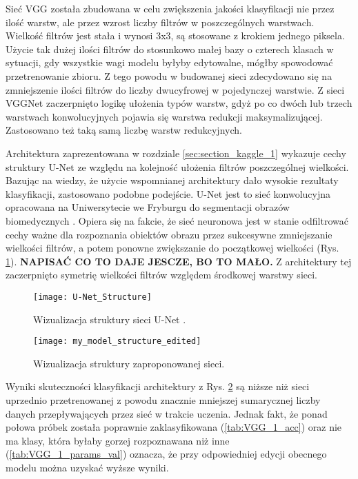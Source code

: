 {Sieć VGG została zbudowana w celu zwiększenia jakości klasyfikacji nie przez ilość warstw, ale przez wzrost liczby filtrów w poszczególnych warstwach. Wielkość filtrów jest stała i wynosi 3x3, są stosowane z krokiem jednego piksela. Użycie tak dużej ilości filtrów do stosunkowo małej bazy o czterech klasach w sytuacji, gdy wszystkie wagi modelu byłyby edytowalne, mógłby spowodować przetrenowanie zbioru. Z tego powodu w budowanej sieci zdecydowano się na zmniejszenie ilości filtrów do liczby dwucyfrowej w pojedynczej warstwie. Z sieci VGGNet zaczerpnięto logikę ułożenia typów warstw, gdyż po co dwóch lub trzech warstwach konwolucyjnych pojawia się warstwa redukcji maksymalizującej. Zastosowano też taką samą liczbę warstw redukcyjnych.

Architektura zaprezentowana w rozdziale \ref{sec:section_kaggle_1} wykazuje cechy struktury U-Net ze względu na kolejność ułożenia filtrów poszczególnej wielkości. Bazując na wiedzy, że użycie wspomnianej architektury dało wysokie rezultaty klasyfikacji, zastosowano podobne podejście. U-Net jest to sieć konwolucyjna opracowana na Uniwersytecie we Fryburgu do segmentacji obrazów biomedycznych \cite{Ronneberger2015UNetCN}. Opiera się na fakcie, że sieć neuronowa jest w stanie odfiltrować cechy ważne dla rozpoznania obiektów obrazu przez sukcesywne zmniejszanie wielkości filtrów, a potem ponowne zwiększanie do początkowej wielkości (Rys. \ref{fig:u-net_structure}). \textbf{NAPISAĆ CO TO DAJE JESCZE, BO TO MAŁO.} Z architektury tej zaczerpnięto symetrię wielkości filtrów względem środkowej warstwy sieci. 

\begin{figure}[h]
	\centering
	\centering
		\texttt{[image: U-Net\_Structure]}	
	\caption{Wizualizacja struktury sieci U-Net \cite{Silburt2019LunarCI}.}
	\label{fig:u-net_structure}
\end{figure}


\begin{figure}[h]
	\centering
	\centering
		\texttt{[image: my\_model\_structure\_edited]}	
	\caption{Wizualizacja struktury zaproponowanej sieci.}
	\label{fig:ann_visualisation}
\end{figure}

Wyniki skuteczności klasyfikacji architektury z Rys. \ref{fig:ann_visualisation} są niższe niż sieci uprzednio przetrenowanej z powodu znacznie mniejszej sumarycznej liczby danych przepływających przez sieć w trakcie uczenia. Jednak fakt, że ponad połowa próbek została poprawnie zaklasyfikowana (\ref{tab:VGG_1_acc}) oraz nie ma klasy, która byłaby gorzej rozpoznawana niż inne (\ref{tab:VGG_1_params_val}) oznacza, że przy odpowiedniej edycji obecnego modelu można uzyskać wyższe wyniki.

}
